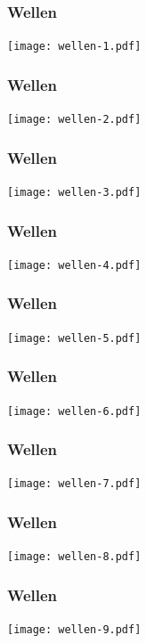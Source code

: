 \documentclass{beamer}
\begin{document}
\begin{frame}
\frametitle{Wellen}
\begin{center}
\texttt{[image: wellen-1.pdf]}
\end{center}
\end{frame}

\begin{frame}
\frametitle{Wellen}
\begin{center}
\texttt{[image: wellen-2.pdf]}
\end{center}
\end{frame}

\begin{frame}
\frametitle{Wellen}
\begin{center}
\texttt{[image: wellen-3.pdf]}
\end{center}
\end{frame}

\begin{frame}
\frametitle{Wellen}
\begin{center}
\texttt{[image: wellen-4.pdf]}
\end{center}
\end{frame}

\begin{frame}
\frametitle{Wellen}
\begin{center}
\texttt{[image: wellen-5.pdf]}
\end{center}
\end{frame}

\begin{frame}
\frametitle{Wellen}
\begin{center}
\texttt{[image: wellen-6.pdf]}
\end{center}
\end{frame}

\begin{frame}
\frametitle{Wellen}
\begin{center}
\texttt{[image: wellen-7.pdf]}
\end{center}
\end{frame}

\begin{frame}
\frametitle{Wellen}
\begin{center}
\texttt{[image: wellen-8.pdf]}
\end{center}
\end{frame}

\begin{frame}
\frametitle{Wellen}
\begin{center}
\texttt{[image: wellen-9.pdf]}
\end{center}
\end{frame}
\end{document}
